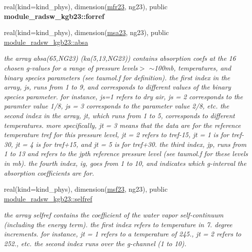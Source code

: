 \begin{DoxyCompactItemize}
real(kind=kind\+\_\+phys), dimension(\hyperlink{group__module__radsw__kgbnn_ga78b43ec4bc2afd4f520480a8410d9df5}{mfr23}, ng23), public {\bfseries module\+\_\+radsw\+\_\+kgb23\+::forref}
\item 
\mbox{\label{group__module__radsw__kgbnn_ga2541e41c7d445a2ce73283e2fb76270c}} 
real(kind=kind\+\_\+phys), dimension(\hyperlink{namespacemodule__radsw__kgb23_a744e7ef73b8d3cc01ff9c6a6010d95d7}{msa23}, ng23), public \hyperlink{group__module__radsw__kgbnn_ga2541e41c7d445a2ce73283e2fb76270c}{module\+\_\+radsw\+\_\+kgb23\+::absa}
\begin{DoxyCompactList}\small\item\em the array absa(65,\+N\+G23) (ka(5,13,\+N\+G23)) contains absorption coefs at the 16 chosen g-\/values for a range of pressure levels$>$ $\sim$100mb, temperatures, and binary species parameters (see taumol.\+f for definition). the first index in the array, js, runs from 1 to 9, and corresponds to different values of the binary species parameter. for instance, js=1 refers to dry air, js = 2 corresponds to the paramter value 1/8, js = 3 corresponds to the parameter value 2/8, etc. the second index in the array, jt, which runs from 1 to 5, corresponds to different temperatures. more specifically, jt = 3 means that the data are for the reference temperature tref for this pressure level, jt = 2 refers to tref-\/15, jt = 1 is for tref-\/30, jt = 4 is for tref+15, and jt = 5 is for tref+30. the third index, jp, runs from 1 to 13 and refers to the jpth reference pressure level (see taumol.\+f for these levels in mb). the fourth index, ig, goes from 1 to 10, and indicates which g-\/interval the absorption coefficients are for. \end{DoxyCompactList}\item 
\mbox{\label{group__module__radsw__kgbnn_gae4e51bcb3c3cbaaf1476d5ab18b072e5}} 
real(kind=kind\+\_\+phys), dimension(\hyperlink{group__module__radsw__kgbnn_gab96959c26232963a568609451483843e}{msf23}, ng23), public \hyperlink{group__module__radsw__kgbnn_gae4e51bcb3c3cbaaf1476d5ab18b072e5}{module\+\_\+radsw\+\_\+kgb23\+::selfref}
\begin{DoxyCompactList}\small\item\em the array selfref contains the coefficient of the water vapor self-\/continuum (including the energy term). the first index refers to temperature in 7. degree increments. for instance, jt = 1 refers to a temperature of 245., jt = 2 refers to 252., etc. the second index runs over the g-\/channel (1 to 10). \end{DoxyCompactList}\item 

\end{DoxyCompactItemize}
